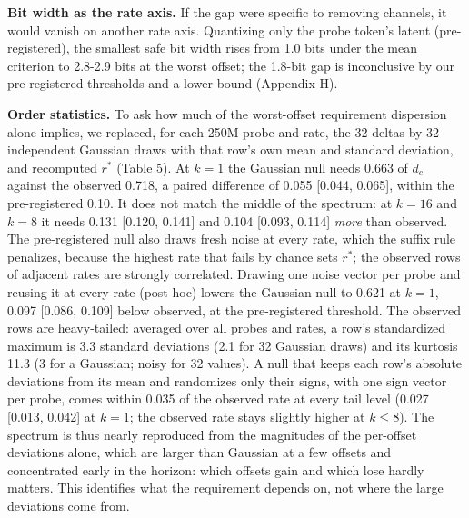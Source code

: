 \documentclass[10pt]{article}
\begin{document}
\textbf{Bit width as the rate axis.} If the gap were specific to removing channels, it would vanish on another rate axis. Quantizing only the probe token's latent (pre-registered), the smallest safe bit width rises from 1.0 bits under the mean criterion to 2.8-2.9 bits at the worst offset; the 1.8-bit gap is inconclusive by our pre-registered thresholds and a lower bound (Appendix H).

\textbf{Order statistics.} To ask how much of the worst-offset requirement dispersion alone implies, we replaced, for each 250M probe and rate, the 32 deltas by 32 independent Gaussian draws with that row's own mean and standard deviation, and recomputed $r^*$ (Table 5). At $k=1$ the Gaussian null needs 0.663 of $d_c$ against the observed 0.718, a paired difference of 0.055 [0.044, 0.065], within the pre-registered 0.10. It does not match the middle of the spectrum: at $k=16$ and $k=8$ it needs 0.131 [0.120, 0.141] and 0.104 [0.093, 0.114] \textit{more} than observed. The pre-registered null also draws fresh noise at every rate, which the suffix rule penalizes, because the highest rate that fails by chance sets $r^*$; the observed rows of adjacent rates are strongly correlated. Drawing one noise vector per probe and reusing it at every rate (post hoc) lowers the Gaussian null to 0.621 at $k=1$, 0.097 [0.086, 0.109] below observed, at the pre-registered threshold. The observed rows are heavy-tailed: averaged over all probes and rates, a row's standardized maximum is 3.3 standard deviations (2.1 for 32 Gaussian draws) and its kurtosis 11.3 (3 for a Gaussian; noisy for 32 values). A null that keeps each row's absolute deviations from its mean and randomizes only their signs, with one sign vector per probe, comes within 0.035 of the observed rate at every tail level (0.027 [0.013, 0.042] at $k=1$; the observed rate stays slightly higher at $k\le8$). The spectrum is thus nearly reproduced from the magnitudes of the per-offset deviations alone, which are larger than Gaussian at a few offsets and concentrated early in the horizon: which offsets gain and which lose hardly matters. This identifies what the requirement depends on, not where the large deviations come from.
\end{document}

